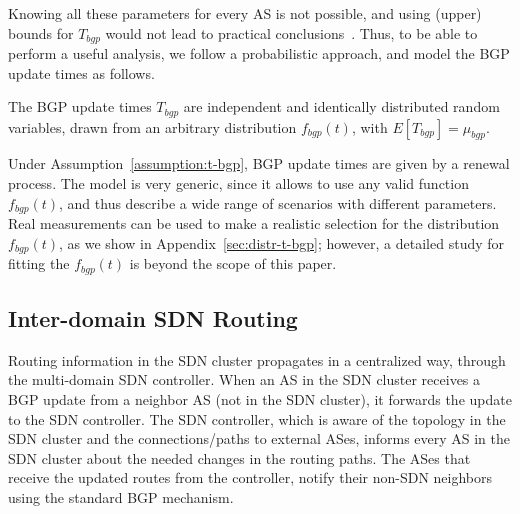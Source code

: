 Knowing all these parameters for every AS is not possible, and using (upper) bounds for $T_{bgp}$ would not lead to practical conclusions~\cite{Labozitz-Delayed-convergence-CCR-2000}. Thus, to be able to perform a useful analysis, we follow a probabilistic approach, and model the BGP update times as follows.


\begin{assumption}\label{assumption:t-bgp}
The BGP update times $T_{bgp}$ are independent and identically distributed random variables, drawn from an arbitrary distribution $f_{bgp}(t)$, with $E[T_{bgp}] = \mu_{bgp}$.
\end{assumption}
Under Assumption~\ref{assumption:t-bgp}, BGP update times are given by a renewal process. The model is very generic, since it allows to use any valid function $f_{bgp}(t)$, and thus describe a wide range of scenarios with different parameters. Real measurements can be used to make a realistic selection for the distribution $f_{bgp}(t)$, as we show in Appendix~\ref{sec:distr-t-bgp}; however, a detailed study for fitting the $f_{bgp}(t)$ is beyond the scope of this paper.





\subsection{Inter-domain SDN Routing}
Routing information in the SDN cluster propagates in a centralized way, through the multi-domain SDN controller. When an AS in the SDN cluster receives a BGP update from a neighbor AS (not in the SDN cluster), it forwards the update to the SDN controller. The SDN controller, which is aware of the topology in the SDN cluster and the connections/paths to external ASes, informs every AS in the SDN cluster about the needed changes in the routing paths. The ASes that receive the updated routes from the controller, notify their non-SDN neighbors using the standard BGP mechanism. 



